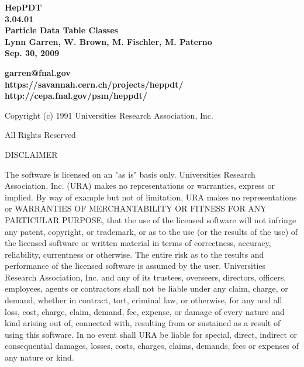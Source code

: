 \begin{titlepage}

{}

\vspace{2.0in}
\begin{center}
  {\LARGE\bf  HepPDT \\ 3.04.01 \\}
  {\Large\bf  Particle Data Table Classes \\}
  {\Large\bf  Lynn Garren, W. Brown, M. Fischler, M. Paterno \\}
  {\Large\bf  Sep. 30, 2009 \\}
\end{center}
\vspace{2.0in}
\begin{center}
  {\large\bf  garren@fnal.gov \\}
  {\large\bf  https://savannah.cern.ch/projects/heppdt/ \\}
  {\large\bf  http://cepa.fnal.gov/psm/heppdt/ \\}
\end{center}

\end{titlepage}

\vspace{0.5in}
\centerline{ Copyright (c) 1991   Universities Research Association, Inc. }
\centerline{   All Rights Reserved }
\vspace{0.2in}
\centerline{ DISCLAIMER }

The software is licensed on an "as is" basis only.  Universities Research
Association, Inc. (URA) makes no representations or warranties, express
or implied.  By way of example but not of limitation, URA makes no
representations or WARRANTIES OF MERCHANTABILITY OR FITNESS FOR ANY
PARTICULAR PURPOSE, that  the use of the licensed software will not
infringe any patent, copyright, or trademark, or as to the use (or the
results of the use) of the licensed  software or written material in
terms of correctness, accuracy, reliability, currentness or otherwise.
The entire risk as to the results and performance of the  licensed
software is assumed by the user.  Universities Research Association, Inc.
and any of its trustees, overseers, directors, officers, employees,
agents or contractors shall not be liable under any claim, charge, or
demand, whether in contract, tort, criminal law, or otherwise, for any
and all loss, cost, charge, claim, demand, fee, expense, or damage of
every nature and kind arising out of, connected with, resulting from or
sustained as a result of using this software. In no event shall URA be
liable for special, direct, indirect or consequential damages, losses,
costs, charges, claims, demands, fees or expenses of any  nature or kind.
 
